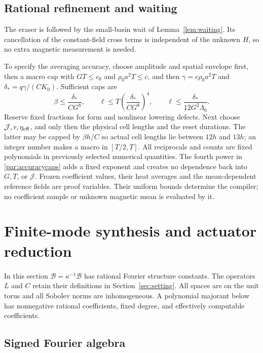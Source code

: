 \documentclass[11pt,a4paper]{amsart}
\theoremstyle{definition}
\theoremstyle{remark}
\numberwithin{equation}{section}
\newcommand{\Bcal}{\mathcal B}
\newcommand{\Bhat}{\widehat{\Bcal}}
\begin{document}
\subsection{Rational refinement and waiting}
The eraser is followed by the small-basin wait of Lemma~\ref{lem:waiting}. Its cancellation of the constant-field cross terms is independent of the unknown $H$, so no extra magnetic measurement is needed.

To specify the averaging accuracy, choose amplitude and spatial envelope
first, then a macro cap with $GT\le c_0$ and $\rho_0a^2T\le c$, and then
$\gamma=c\rho_0a^2T$ and $\delta_*=q\gamma/(CK_0)$. Sufficient caps are
\begin{equation}\label{par:accuracycaps}
 \beta\le\frac{\delta_*}{CG^8},\qquad
 \ell\le T\left(\frac{\delta_*}{CG^8}\right)^4,\qquad
 \ell\le\frac{\delta_*}{12G^2\Lambda_0}.
\end{equation}
Reserve fixed fractions for form and nonlinear lowering defects. Next choose
$\mathcal J,r,\eta_{\rm eff}$, and only then the physical cell lengths and
the reset durations. The latter may be capped by $\beta h/C$ so actual cell
lengths lie between $12h$ and $13h$; an integer number makes a macro in
$[T/2,T]$. All reciprocals and counts are fixed polynomials in previously
selected numerical quantities. The fourth power in \eqref{par:accuracycaps}
adds a fixed exponent and creates no dependence back into $G,T$, or
$\mathcal J$. Frozen coefficient values, their heat averages and the
mean-dependent reference fields are proof variables. Their uniform bounds
determine the compiler; no coefficient sample or unknown magnetic mean is
evaluated by it.



\section{Finite-mode synthesis and actuator reduction}\label{cmp:section}\label{sec:compiler}

In this section $\Bhat=\kappa^{-1}\Bcal$ has rational Fourier structure constants. The operators $L$ and $C$ retain their definitions in Section~\ref{sec:setting}.
All spaces are on the unit torus and all Sobolev norms are inhomogeneous.
A polynomial majorant below has nonnegative rational coefficients, fixed
degree, and effectively computable coefficients.

\subsection{Signed Fourier algebra}\label{cmp:algebra}
\end{document}
